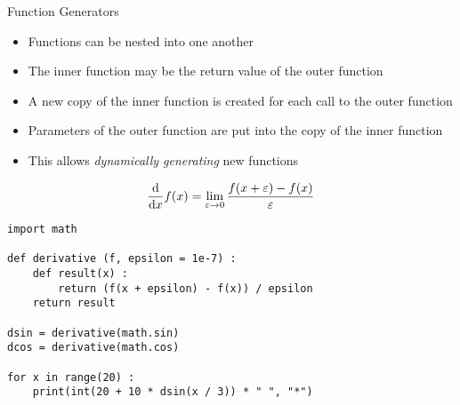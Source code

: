 
\begin{frame}[fragile]{Function Generators}
%
\begin{itemize}
\item Functions can be nested into one another
\item The inner function may be the return value of the outer function
\item A new copy of the inner function is created for each call to the outer function
\item Parameters of the outer function are put into the copy of the inner function
\item This allows \emph{dynamically generating} new functions
\end{itemize}
%
\end{frame}


\begin{frame}[fragile]
%
\begin{tcolorbox}[title=Differential Quotient]
	\begin{equation*}
	\dv{x} f(x)
=
	\lim_{\varepsilon \to 0}
		\frac
			{f(x + \varepsilon) - f(x)}
			{\varepsilon}
	\end{equation*}
\end{tcolorbox}
%
\begin{codebox}
\begin{verbatim}
import math

def derivative (f, epsilon = 1e-7) :
    def result(x) :
        return (f(x + epsilon) - f(x)) / epsilon
    return result

dsin = derivative(math.sin)
dcos = derivative(math.cos)

for x in range(20) :
    print(int(20 + 10 * dsin(x / 3)) * " ", "*")
\end{verbatim}
\end{codebox}
%
\end{frame}


